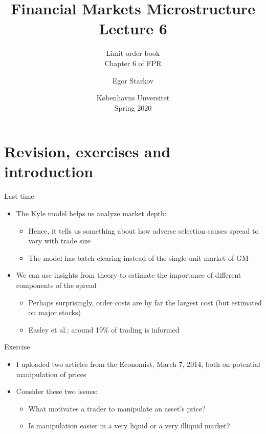 \documentclass[english,10pt]{beamer}
\title{Financial Markets Microstructure \\ Lecture 6}
\subtitle{Limit order book\\
	Chapter 6 of FPR}
\author{Egor Starkov}
\date{K{\o}benhavns Unversitet \\
	Spring 2020}
\begin{document}
\frame[plain]{\titlepage}

\section{Revision, exercises and introduction}

\begin{frame}{Last time}
	\begin{itemize}
		\item The Kyle model helps us analyze market depth:
		\begin{itemize}
			\item Hence, it tells us something about how adverse selection causes spread to vary with trade size
			\item The model has batch clearing instead of the single-unit market of GM
		\end{itemize}
		\item We can use insights from theory to estimate the importance of different components of the spread
		\begin{itemize}
			\item Perhaps surprisingly, order costs are by far the largest cost (but estimated on major stocks)
			\item Easley et al.: around 19\% of trading is informed
		\end{itemize}
	\end{itemize}
\end{frame}


\begin{frame}{Exercise}
	\begin{itemize}
		\item I uploaded two articles from the Economist, March 7, 2014, both on potential manipulation of prices
		\item Consider these two issues:
		\begin{itemize}
			\item What motivates a trader to manipulate an asset's price? 
			\item Is manipulation easier in a very liquid or a very illiquid market?
		\end{itemize}
	\end{itemize}
\end{frame}
\end{document}
